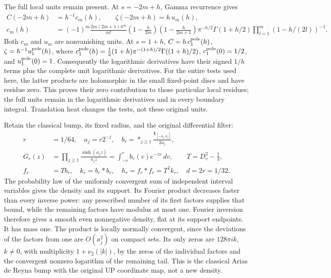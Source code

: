 \documentclass[
  10pt,
  a4paper,
]{article}
\begin{document}
The full local units remain present. At \(s=-2m+h\), Gamma recurrence
gives \[
\begin{aligned}
C(-2m+h)&=h^{-1}c_m(h),\qquad \zeta(-2m+h)=h\,u_m(h),\\
c_m(h)&=(-1)^m\frac{2m(2m+1)\pi^m}{m!}
\left(1-\frac h{2m}\right)\left(1-\frac h{2m+1}\right)
\pi^{-h/2}\Gamma(1+h/2)
\prod_{l=1}^m(1-h/(2l))^{-1}.
\end{aligned}
\tag{OZG2a}
\] Both \(c_m\) and \(u_m\) are nonvanishing units. At \(s=1+h\),
\(C=h\,c_1^{\rm pole}(h)\), \(\zeta=h^{-1}u_1^{\rm pole}(h)\), where
\(c_1^{\rm pole}(h)=\tfrac12(1+h)\pi^{-(1+h)/2}\Gamma((1+h)/2)\),
\(c_1^{\rm pole}(0)=1/2\), and \(u_1^{\rm pole}(0)=1\). Consequently the
logarithmic derivatives have their signed \(1/h\) terms plus the
complete unit logarithmic derivatives. For the entire tests used here,
the latter products are holomorphic in the small fixed-point discs and
have residue zero. This proves their zero contribution to those
particular local residues; the full units remain in the logarithmic
derivatives and in every boundary integral. Translation heat changes the
tests, not these original units.

Retain the classical bump, its fixed radius, and the original
differential filter: \[
\begin{aligned}
r&=1/64,\quad a_j=r2^{-j},\quad
b_r=*_{j\ge1}\frac{\mathbf1_{[-a_j,a_j]}}{2a_j},\\
G_r(z)&=\prod_{j\ge1}\frac{\sinh(a_jz)}{a_jz}
=\int_{-r}^{r}b_r(v)e^{-zv}\,dv,\qquad
T=D_v^2-\tfrac14,\\
f_r&=Tb_r,\quad k_r=b_r*b_r,\quad h_r=f_r*f_r=T^2k_r,\quad d=2r=1/32.
\end{aligned}
\tag{OZG3}
\] The probability law of the uniformly convergent sum of independent
interval variables gives the density and its support. Its Fourier
product decreases faster than every inverse power: any prescribed number
of its first factors supplies that bound, while the remaining factors
have modulus at most one. Fourier inversion therefore gives a smooth
even nonnegative density, flat at its support endpoints. It has mass
one. The product is locally normally convergent, since the deviations of
the factors from one are \(O(a_j^2)\) on compact sets. Its only zeros
are \(128\pi i k\), \(k\ne0\), with multiplicity \(1+\nu_2(|k|)\), by
the zeros of the individual factors and the convergent nonzero logarithm
of the remaining tail. This is the classical Arias de Reyna bump with
the original UP coordinate map, not a new density.
\end{document}
